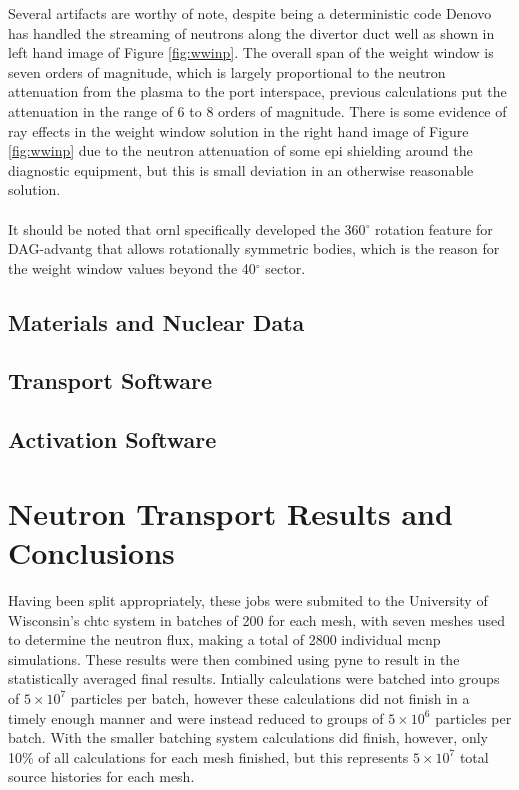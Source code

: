 \documentclass[12pt]{article}
\begin{document}
Several artifacts are worthy of note, despite being a deterministic code Denovo
has handled the streaming of neutrons along the divertor duct well as shown in
left hand image of Figure \ref{fig:wwinp}. The overall span of the weight window
is seven orders of magnitude, which is largely proportional to the neutron
attenuation from the plasma to the port interspace, previous calculations put
the attenuation in the range of 6 to 8 orders of magnitude. There is some
evidence of ray effects in the weight window solution in the right hand image
of Figure \ref{fig:wwinp} due to the neutron attenuation of some \gls{epi}
shielding around the diagnostic equipment, but this is small deviation in an
otherwise reasonable solution.
\\
\\
It should be noted that \gls{ornl} specifically developed the 360$^{\circ}$
rotation feature for DAG-\gls{advantg} that allows rotationally symmetric
bodies, which is the reason for the weight window values beyond the
40$^{\circ}$ sector.
\subsection{Materials and Nuclear Data}
\subsection{Transport Software}
\subsection{Activation Software}

\section{Neutron Transport Results and Conclusions}
Having been split appropriately, these jobs were submited to the University of
Wisconsin's \gls{chtc} system in batches of 200
for each mesh, with seven meshes used to determine the neutron flux, making a
total of 2800 individual \gls{mcnp} simulations. These results were then
combined using \gls{pyne} to result in the statistically averaged final results.
Intially calculations were batched into groups of $5\times10^7$ particles per
batch, however these calculations did not finish in a timely enough manner and
were instead reduced to groups of $5\times10^6$ particles per batch. With the
smaller batching system calculations did finish, however, only 10\% of all
calculations for each mesh finished, but this represents $5\times10^7$ total
source histories for each mesh. 
\newpage
\clearpage
\end{document}
